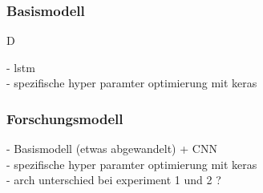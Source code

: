 \subsubsection*{Basismodell}\label{sec:modellierung_basis_goog}

D

- lstm \\
- spezifische hyper paramter optimierung mit keras

\subsubsection*{Forschungsmodell}\label{sec:modellierung_forsch}

- Basismodell (etwas abgewandelt) + CNN \\
- spezifische hyper paramter optimierung mit keras \\
- arch unterschied bei experiment 1 und 2 ?








